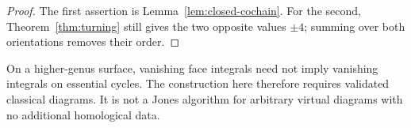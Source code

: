 \begin{proof}
The first assertion is Lemma~\ref{lem:closed-cochain}. For the second,
Theorem~\ref{thm:turning} still gives the two opposite values $\pm4$;
summing over both orientations removes their order.
\end{proof}

\begin{remark}
On a higher-genus surface, vanishing face integrals need not imply
vanishing integrals on essential cycles. The construction here therefore
requires validated classical diagrams. It is not a Jones algorithm for
arbitrary virtual diagrams with no additional homological data.
\end{remark}
